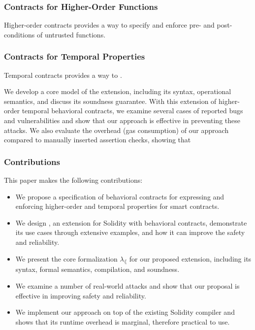 \documentclass[acmsmall,review,anonymous]{acmart}\settopmatter{printfolios=true,printccs=false,printacmref=false}
\begin{document}
\subsubsection*{\textbf{Contracts for Higher-Order Functions}}
Higher-order contracts provides a way to specify and enforce pre- and
post-conditions of untrusted functions. 


\subsubsection*{\textbf{Contracts for Temporal Properties}}
Temporal contracts provides a way to .


We develop a core model of the extension, including its syntax,
operational semantics, and discuss its soundness guarantee.
With this extension of higher-order temporal behavioral contracts, we examine
several cases of reported bugs and vulnerabilities and show that
our approach is effective in preventing these attacks.
We also evaluate the overhead (gas consumption) of our approach
compared to manually inserted assertion checks, showing that 




\subsubsection*{\textbf{Contributions}} This paper makes the following contributions:
\begin{itemize}
	\item We propose a specification of behavioral contracts for expressing and
	      enforcing higher-order and temporal properties for smart contracts.
	\item We design \lang, an extension for Solidity with
	      behavioral contracts, demonstrate its use cases through extensive examples,
	      and how it can improve the safety and reliability.
	\item We present the core formalization $\lambda_\lang$ for our proposed
	      extension, including its syntax, formal semantics, compilation, and
	      soundness.
	\item We examine a number of real-world attacks and show that our proposal is
	      effective in improving safety and reliability.
	\item We implement our approach on top of the existing Solidity compiler and shows
	      that its runtime overhead is marginal, therefore practical to use.
\end{itemize}
\end{document}
